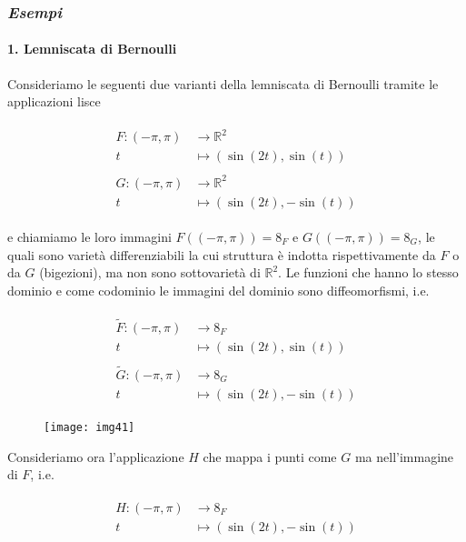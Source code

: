\subsubsection{\textit{Esempi}}

\paragraph{1. Lemniscata di Bernoulli}

Consideriamo le seguenti due varianti della lemniscata di Bernoulli tramite le applicazioni lisce

\begin{align}
	\begin{split}
		F : (-\pi,\pi) &\to \mathbb{R}^{2}\\
		t &\mapsto (\sin(2t),\sin(t))\\\\
		G : (-\pi,\pi) &\to \mathbb{R}^{2}\\
		t &\mapsto (\sin(2t),-\sin(t))
	\end{split}
\end{align}

e chiamiamo le loro immagini $ F((-\pi,\pi)) = \mathfrak{8}_{F} $ e $ G((-\pi,\pi)) = \mathfrak{8}_{G} $, le quali sono varietà differenziabili la cui struttura è indotta rispettivamente da $ F $ o da $ G $ (bigezioni), ma non sono sottovarietà di $ \mathbb{R}^{2} $. Le funzioni che hanno lo stesso dominio e come codominio le immagini del dominio sono diffeomorfismi, i.e.

\begin{align}
	\begin{split}
		\tilde{F} : (-\pi,\pi) &\to \mathfrak{8}_{F}\\
		t &\mapsto (\sin(2t),\sin(t))\\\\
		\tilde{G} : (-\pi,\pi) &\to \mathfrak{8}_{G}\\
		t &\mapsto (\sin(2t),-\sin(t))
	\end{split}
\end{align}

\begin{figure}[H]
	\centering
	\texttt{[image: img41]}
\end{figure}

Consideriamo ora l'applicazione $ H $ che mappa i punti come $ G $ ma nell'immagine di $ F $, i.e.

\begin{align}
	\begin{split}
		H : (-\pi,\pi) &\to \mathfrak{8}_{F}\\
		t &\mapsto (\sin(2t),-\sin(t))
	\end{split}
\end{align}

